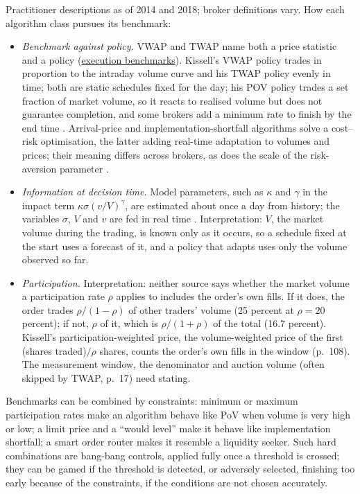 \begin{qfdefinition}
 Practitioner descriptions as of 2014 and 2018; broker definitions vary. How each algorithm class pursues its benchmark:
\begin{itemize}
\item \emph{Benchmark against policy.} VWAP and TWAP name both a price statistic and a policy (\hyperref[def:execution-benchmark]{execution benchmarks}). Kissell's VWAP policy trades in proportion to the intraday volume curve and his TWAP policy evenly in time; both are static schedules fixed for the day; his POV policy trades a set fraction of market volume, so it reacts to realised volume but does not guarantee completion, and some brokers add a minimum rate to finish by the end time \citep[chap.~1, pp.~16--17]{s7-kissellscience}. Arrival-price and implementation-shortfall algorithms solve a cost--risk optimisation, the latter adding real-time adaptation to volumes and prices; their meaning differs across brokers, as does the scale of the risk-aversion parameter \citep[same chap., pp.~17--19]{s7-kissellscience}.
\item \emph{Information at decision time.} Model parameters, such as $\kappa$ and $\gamma$ in the impact term $\kappa\sigma(v/V)^\gamma$, are estimated about once a day from history; the variables $\sigma$, $V$ and $v$ are fed in real time \citep[sec.~3.1.1, p.~197]{alpha-laruelle}. Interpretation: $V$, the market volume during the trading, is known only as it occurs, so a schedule fixed at the start uses a forecast of it, and a policy that adapts uses only the volume observed so far.
\item \emph{Participation.} Interpretation: neither source says whether the market volume a participation rate $\rho$ applies to includes the order's own fills. If it does, the order trades $\rho/(1-\rho)$ of other traders' volume (25 percent at $\rho=20$ percent); if not, $\rho$ of it, which is $\rho/(1+\rho)$ of the total (16.7 percent). Kissell's participation-weighted price, the volume-weighted price of the first (shares traded)$/\rho$ shares, counts the order's own fills in the window (p.~108). The measurement window, the denominator and auction volume (often skipped by TWAP, p.~17) need stating.
\end{itemize}

 Benchmarks can be combined by constraints: minimum or maximum participation rates make an algorithm behave like PoV when volume is very high or low; a limit price and a ``would level'' make it behave like implementation shortfall; a smart order router makes it resemble a liquidity seeker. Such hard combinations are bang-bang controls, applied fully once a threshold is crossed; they can be gamed if the threshold is detected, or adversely selected, finishing too early because of the constraints, if the conditions are not chosen accurately.


\end{qfdefinition}
